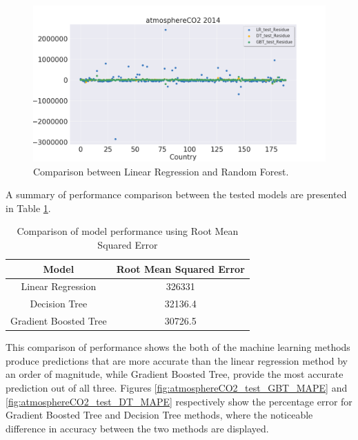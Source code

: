 \documentclass[11pt,a4paper,titlepage]{article}
\begin{document}
\begin{figure}[!htbp]
    \begin{center}
        \includegraphics[width=\textwidth]{../Plots/atmosphereCO2_test_residue.png}
        \caption{Comparison between Linear Regression and Random Forest.}
        \label{fig:atmosphereCO2_test_residue}
    \end{center}
\end{figure}

A summary of performance comparison between the tested models are presented in Table \ref{PerformanceComp}.

\begin{table}[htbp!]
    \begin{center}
        \begin{tabular}{ |c|c| } 
        \hline
        Model & Root Mean Squared Error \\ 
        \hline
        Linear Regression & 326331 \\
        Decision Tree & 32136.4 \\
        Gradient Boosted Tree & 30726.5 \\
        \hline
        \end{tabular}
        \caption{Comparison of model performance using Root Mean Squared Error}
        \label{PerformanceComp}
    \end{center}
\end{table}

This comparison of performance shows the both of the machine learning methods produce predictions that are more accurate than the linear regression method by an order of magnitude, while Gradient Boosted Tree, provide the most accurate prediction out of all three. Figures \ref{fig:atmosphereCO2_test_GBT_MAPE} and \ref{fig:atmosphereCO2_test_DT_MAPE} respectively show the percentage error for Gradient Boosted Tree and Decision Tree methods, where the noticeable difference in accuracy between the two methods are displayed.
\end{document}
